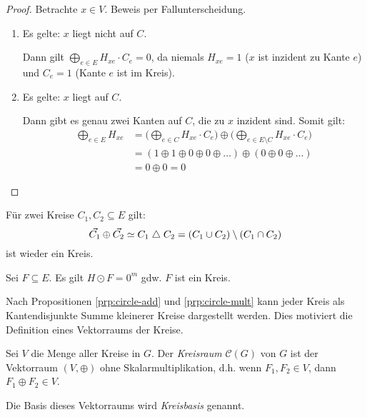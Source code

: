 \begin{proof}
    Betrachte $ x \in V $.
    Beweis per Fallunterscheidung.
    \begin{enumerate}
        \item Es gelte: $ x $ liegt nicht auf $ C $.

        Dann gilt $ \bigoplus_{e \in E} H_{xe} \cdot C_e = 0 $, da niemals $ H_{xe} = 1 $ ($ x $ ist inzident zu Kante $ e $) und $ C_e = 1 $ (Kante $ e $ ist im Kreis).

        \item Es gelte: $ x $ liegt auf $ C $.

        Dann gibt es genau zwei Kanten auf $ C $, die zu $ x $ inzident sind.
        Somit gilt:
        \begin{align*}
            \bigoplus_{e \in E} H_{xe} &= \big(\bigoplus_{e \in C} H_{xe} \cdot C_e\big) \oplus \big(\bigoplus_{e \in E \setminus C} H_{xe} \cdot C_e\big) \\
            &= (1 \oplus 1 \oplus 0 \oplus 0 \oplus \dots) \oplus (0 \oplus 0 \oplus \dots) \\
            &= 0 \oplus 0 = 0
        \end{align*}
    \end{enumerate}
\end{proof}

\begin{proposition}
    \label{prp:circle-add}
    Für zwei Kreise $ C_1, C_2 \subseteq E $ gilt:
    \begin{equation*}
        \vec{C_1} \oplus \vec{C_2} \simeq C_1 \mathrel{\triangle} C_2 = (C_1 \cup C_2) \setminus (C_1 \cap C_2)
    \end{equation*}
    ist wieder ein Kreis.
\end{proposition}

\begin{proposition}
    \label{prp:circle-mult}
    Sei $ F \subseteq E $.
    Es gilt $ H \odot F = 0^m $ gdw. $ F $ ist ein Kreis.
\end{proposition}

\begin{remark}
    Nach Propositionen \ref{prp:circle-add} und \ref{prp:circle-mult} kann jeder Kreis als Kantendisjunkte Summe kleinerer Kreise dargestellt werden.
    Dies motiviert die Definition eines Vektorraums der Kreise.
\end{remark}

\begin{definition}[Kreisraum]
    Sei $ V $ die Menge aller Kreise in $ G $.
    Der \textit{Kreisraum} $ \mathcal{C}(G) $ von $ G $ ist der Vektorraum $ (V, \oplus) $ ohne Skalarmultiplikation, d.h. wenn $ F_1, F_2 \in V $, dann $ F_1 \oplus F_2 \in V $.

    Die Basis dieses Vektorraums wird \textit{Kreisbasis} genannt.
\end{definition}

